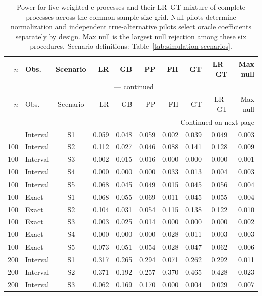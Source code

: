 \documentclass[12pt]{article}
\theoremstyle{definition}
\theoremstyle{remark}
\begin{document}
\begingroup
\scriptsize
\setlength{\tabcolsep}{3pt}
\renewcommand{\arraystretch}{1.10}
\setlength{\LTcapwidth}{\textwidth}
\begin{longtable}{rlcrrrrrrr}
\caption{Power for five weighted e-processes and their LR--GT mixture of complete processes across the common sample-size grid. Null pilots determine normalization and independent true-alternative pilots select oracle coefficients separately by design. Max null is the largest null rejection among these six procedures. Scenario definitions: Table~\ref{tab:simulation-scenarios}.}\label{tab:weight-battery}\\
\toprule
$n$ & Obs. & Scenario & LR & GB & PP & FH & GT & LR--GT & Max null \\
\midrule
\endfirsthead
\multicolumn{10}{c}{\tablename\ \thetable{} --- continued}\\
\toprule
$n$ & Obs. & Scenario & LR & GB & PP & FH & GT & LR--GT & Max null \\
\midrule
\endhead
\midrule
\multicolumn{10}{r}{Continued on next page}\\
\endfoot
\bottomrule
\endlastfoot
100 & Interval & S1 & 0.059 & 0.048 & 0.059 & 0.002 & 0.039 & 0.049 & 0.003 \\
100 & Interval & S2 & 0.112 & 0.027 & 0.046 & 0.088 & 0.141 & 0.128 & 0.009 \\
100 & Interval & S3 & 0.002 & 0.015 & 0.016 & 0.000 & 0.000 & 0.000 & 0.001 \\
100 & Interval & S4 & 0.000 & 0.000 & 0.000 & 0.033 & 0.013 & 0.004 & 0.003 \\
100 & Interval & S5 & 0.068 & 0.045 & 0.049 & 0.015 & 0.045 & 0.056 & 0.004 \\
100 & Exact & S1 & 0.068 & 0.055 & 0.069 & 0.011 & 0.045 & 0.055 & 0.004 \\
100 & Exact & S2 & 0.104 & 0.031 & 0.054 & 0.115 & 0.138 & 0.122 & 0.010 \\
100 & Exact & S3 & 0.003 & 0.025 & 0.014 & 0.000 & 0.000 & 0.000 & 0.002 \\
100 & Exact & S4 & 0.000 & 0.000 & 0.000 & 0.028 & 0.011 & 0.003 & 0.003 \\
100 & Exact & S5 & 0.073 & 0.051 & 0.054 & 0.028 & 0.047 & 0.062 & 0.006 \\
200 & Interval & S1 & 0.317 & 0.265 & 0.294 & 0.071 & 0.262 & 0.292 & 0.011 \\
200 & Interval & S2 & 0.371 & 0.192 & 0.257 & 0.370 & 0.465 & 0.428 & 0.023 \\
200 & Interval & S3 & 0.062 & 0.169 & 0.170 & 0.000 & 0.004 & 0.029 & 0.007 \\

\end{longtable}
\end{document}
